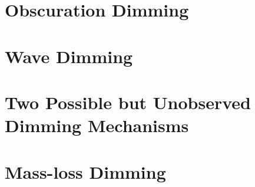 \section{Obscuration Dimming}

\section{Wave Dimming}
\label{sec:waveDimming}

\section{Two Possible but Unobserved Dimming Mechanisms}

\section{Mass-loss Dimming}

